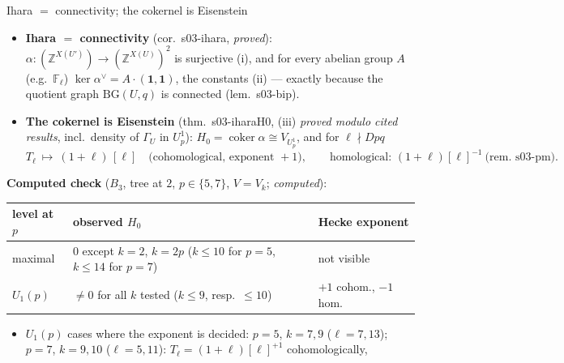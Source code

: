 \begin{frame}{Ihara $=$ connectivity; the cokernel is Eisenstein}
  \footnotesize
  \begin{itemize}
    \item \textbf{Ihara $=$ connectivity} (cor.\ s03-ihara, \emph{proved}): $\alpha:(\mathbb Z^{X(U')})\to(\mathbb Z^{X(U)})^2$ is
      surjective (i), and for every abelian group $A$ (e.g.\ $\mathbb F_\ell$) $\ker\alpha^\vee=A\cdot(\mathbf 1,\mathbf 1)$, the constants (ii)
      --- exactly because the quotient graph $\mathrm{BG}(U,q)$ is connected (lem.\ s03-bip).
    \item \textbf{The cokernel is Eisenstein} (thm.\ s03-iharaH0, (iii) \emph{proved modulo cited results}, incl.\ density of $\Gamma_U$ in $U^1_p$):
      $H_0=\operatorname{coker}\alpha\cong V_{U^1_p}$, and for $\ell\nmid Dpq$
      \[T_\ell\ \longmapsto\ (1+\ell)\,[\ell]\quad\text{(cohomological, exponent }+1),\qquad
        \text{homological: }(1+\ell)[\ell]^{-1}\ \text{(rem.\ s03-pm)}.\]
  \end{itemize}
  \vspace{-3mm}
  \textbf{Computed check} ($B_3$, tree at $2$, $p\in\{5,7\}$, $V=V_k$; \emph{computed}):
  \begin{center}\scriptsize
  \begin{tabular}{lp{5.6cm}l}\toprule
    level at $p$ & observed $H_0$ & Hecke exponent\\\midrule
    maximal & $0$ except $k=2$, $k=2p$ ($k\le10$ for $p=5$, $k\le14$ for $p=7$) & not visible\\
    $U_1(p)$ & $\neq0$ for all $k$ tested ($k\le9$, resp.\ $\le10$) & $+1$ cohom., $-1$ hom.\\\bottomrule
  \end{tabular}
  \end{center}
  \vspace{-3mm}
  \begin{itemize}
    \item $U_1(p)$ cases where the exponent is decided: $p=5$, $k=7,9$ ($\ell=7,13$); $p=7$, $k=9,10$ ($\ell=5,11$): $T_\ell=(1+\ell)[\ell]^{+1}$ cohomologically,

\end{itemize}
\end{frame}
